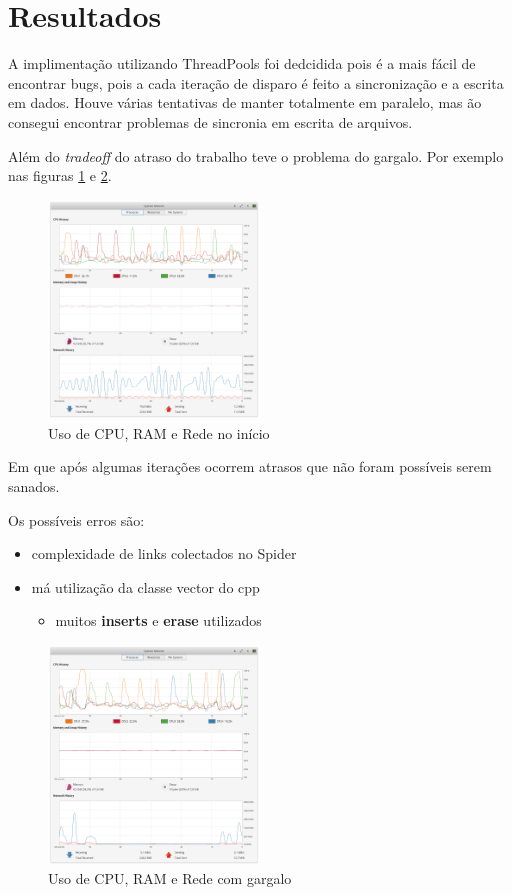 \section{Resultados}

A implimentação utilizando ThreadPools foi dedcidida pois é a mais fácil de encontrar bugs, pois a cada iteração de disparo é feito a sincronização e a escrita em dados. Houve várias tentativas de manter totalmente em paralelo, mas ão consegui encontrar problemas de sincronia em escrita de arquivos.

Além do \textit{tradeoff} do atraso do trabalho teve o problema do gargalo. Por exemplo nas figuras \ref{fig3} e \ref{fig4}.

\begin{figure}
  \includegraphics[width=0.5\textwidth]{images/monitor.png}
  \caption{Uso de CPU, RAM e Rede no início}
  \label{fig3}
\end{figure}

Em que após algumas iterações ocorrem atrasos que não foram possíveis serem sanados.

Os possíveis erros são:

\begin{itemize}
  \item complexidade de links colectados no Spider
  \item má utilização da classe vector do cpp
  \begin{itemize}
    \item muitos \textbf{inserts} e \textbf{erase} utilizados
  \end{itemize}
\end{itemize}

\begin{figure}
  \includegraphics[width=0.5\textwidth]{images/monitorwithgargalo.png}
  \caption{Uso de CPU, RAM e Rede com gargalo}
  \label{fig4}
\end{figure}

